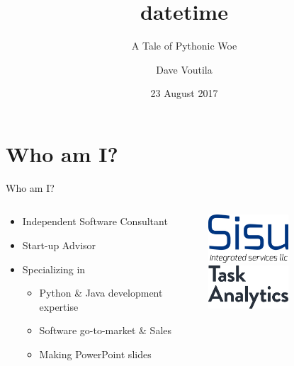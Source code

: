\documentclass[10pt]{beamer}
\title[datetime]{datetime}
\subtitle{A Tale of Pythonic Woe}
\author{Dave Voutila}
\institute{
	voutilad@gmail.com \\
	https://github.com/voutilad \\
	@voutilad
}
\date{23 August 2017}
\newif\ifplacelogo %
\begin{document}
\maketitle

\section{Who am I?}
\begin{frame}{Who am I?}
	\begin{columns}
		\begin{column}{0.5 \textwidth}
			\begin{itemize}
				\item Independent Software Consultant
				\item Start-up Advisor
				\item Specializing in
					\begin{itemize}
						\item Python \& Java development expertise
						\item Software go-to-market \& Sales
						\item Making PowerPoint slides
					\end{itemize}
			\end{itemize}
		\end{column}
		\begin{column}{0.5 \textwidth}
			\centering
			\includegraphics[width=3cm]{images/sisu.png}
			\vspace{1cm}
			\includegraphics[width=3cm]{images/ta.png}
		\end{column}
	\end{columns}
\end{frame}

\placelogofalse
\end{document}
